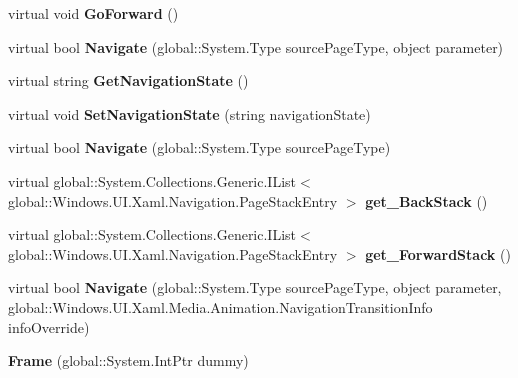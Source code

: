 \begin{DoxyCompactItemize}
virtual void {\bfseries Go\+Forward} ()
\item 
\mbox{\label{class_windows_1_1_u_i_1_1_xaml_1_1_controls_1_1_frame_aa88f5dbc5d0be1aa7a6d29db649b5d3b}} 
virtual bool {\bfseries Navigate} (global\+::\+System.\+Type source\+Page\+Type, object parameter)
\item 
\mbox{\label{class_windows_1_1_u_i_1_1_xaml_1_1_controls_1_1_frame_a61a9544723df665a3302a9c9787d26e5}} 
virtual string {\bfseries Get\+Navigation\+State} ()
\item 
\mbox{\label{class_windows_1_1_u_i_1_1_xaml_1_1_controls_1_1_frame_ad11b0d06a73306aa6bdb716ba217bf42}} 
virtual void {\bfseries Set\+Navigation\+State} (string navigation\+State)
\item 
\mbox{\label{class_windows_1_1_u_i_1_1_xaml_1_1_controls_1_1_frame_a1ba0f46855026734880083781db1286b}} 
virtual bool {\bfseries Navigate} (global\+::\+System.\+Type source\+Page\+Type)
\item 
\mbox{\label{class_windows_1_1_u_i_1_1_xaml_1_1_controls_1_1_frame_a80ca191b072efed7111ea58c25416f2e}} 
virtual global\+::\+System.\+Collections.\+Generic.\+I\+List$<$ global\+::\+Windows.\+U\+I.\+Xaml.\+Navigation.\+Page\+Stack\+Entry $>$ {\bfseries get\+\_\+\+Back\+Stack} ()
\item 
\mbox{\label{class_windows_1_1_u_i_1_1_xaml_1_1_controls_1_1_frame_ae329d75ad7803db9b56a1087833db051}} 
virtual global\+::\+System.\+Collections.\+Generic.\+I\+List$<$ global\+::\+Windows.\+U\+I.\+Xaml.\+Navigation.\+Page\+Stack\+Entry $>$ {\bfseries get\+\_\+\+Forward\+Stack} ()
\item 
\mbox{\label{class_windows_1_1_u_i_1_1_xaml_1_1_controls_1_1_frame_ad618ba9d883d20cb4fe2b759803359e9}} 
virtual bool {\bfseries Navigate} (global\+::\+System.\+Type source\+Page\+Type, object parameter, global\+::\+Windows.\+U\+I.\+Xaml.\+Media.\+Animation.\+Navigation\+Transition\+Info info\+Override)
\item 
\mbox{\label{class_windows_1_1_u_i_1_1_xaml_1_1_controls_1_1_frame_a84fab9df3b200274d2539149011dfb10}} 
{\bfseries Frame} (global\+::\+System.\+Int\+Ptr dummy)
\end{DoxyCompactItemize}
